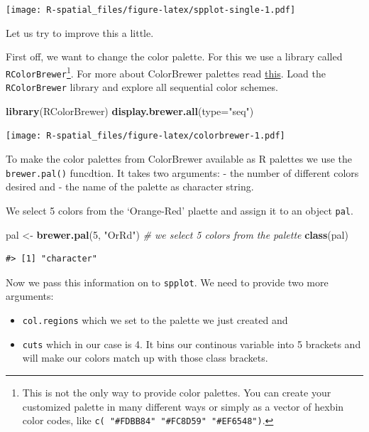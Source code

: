 \documentclass[]{book}
\newenvironment{Shaded}{\begin{snugshade}}{\end{snugshade}}
\newcommand{\KeywordTok}[1]{\textcolor[rgb]{0.13,0.29,0.53}{\textbf{#1}}}
\newcommand{\DataTypeTok}[1]{\textcolor[rgb]{0.13,0.29,0.53}{#1}}
\newcommand{\DecValTok}[1]{\textcolor[rgb]{0.00,0.00,0.81}{#1}}
\newcommand{\StringTok}[1]{\textcolor[rgb]{0.31,0.60,0.02}{#1}}
\newcommand{\CommentTok}[1]{\textcolor[rgb]{0.56,0.35,0.01}{\textit{#1}}}
\newcommand{\NormalTok}[1]{#1}
\providecommand{\tightlist}{%
  \setlength{\itemsep}{0pt}\setlength{\parskip}{0pt}}
\let\rmarkdownfootnote\footnote%
\def\footnote{\protect\rmarkdownfootnote}
\theoremstyle{definition}
\theoremstyle{definition}
\theoremstyle{definition}
\theoremstyle{remark}
\begin{document}
\texttt{[image: R-spatial\_files/figure-latex/spplot-single-1.pdf]}

Let us try to improve this a little.

First off, we want to change the color palette. For this we use a
library called \texttt{RColorBrewer}\footnote{This is not the only way
  to provide color palettes. You can create your customized palette in
  many different ways or simply as a vector of hexbin color codes, like
  \texttt{c(\ "\#FDBB84"\ "\#FC8D59"\ "\#EF6548")}.}. For more about
ColorBrewer palettes read \href{http://colorbrewer2.org}{this}. Load the
\texttt{RColorBrewer} library and explore all sequential color schemes.

\begin{Shaded}
\begin{Highlighting}[]
\KeywordTok{library}\NormalTok{(RColorBrewer)}
\KeywordTok{display.brewer.all}\NormalTok{(}\DataTypeTok{type=}\StringTok{"seq"}\NormalTok{)}
\end{Highlighting}
\end{Shaded}

\texttt{[image: R-spatial\_files/figure-latex/colorbrewer-1.pdf]}

To make the color palettes from ColorBrewer available as R palettes we
use the \texttt{brewer.pal()} funcdtion. It takes two arguments: - the
number of different colors desired and - the name of the palette as
character string.

We select 5 colors from the `Orange-Red' plaette and assign it to an
object \texttt{pal}.

\begin{Shaded}
\begin{Highlighting}[]
\NormalTok{pal <-}\StringTok{ }\KeywordTok{brewer.pal}\NormalTok{(}\DecValTok{5}\NormalTok{, }\StringTok{"OrRd"}\NormalTok{) }\CommentTok{# we select 5 colors from the palette}
\KeywordTok{class}\NormalTok{(pal)}
\end{Highlighting}
\end{Shaded}

\begin{verbatim}
#> [1] "character"
\end{verbatim}

Now we pass this information on to \texttt{spplot}. We need to provide
two more arguments:

\begin{itemize}
\tightlist
\item
  \texttt{col.regions} which we set to the palette we just created and
\item
  \texttt{cuts} which in our case is 4. It bins our continous variable
  into 5 brackets and will make our colors match up with those class
  brackets.
\end{itemize}
\end{document}
